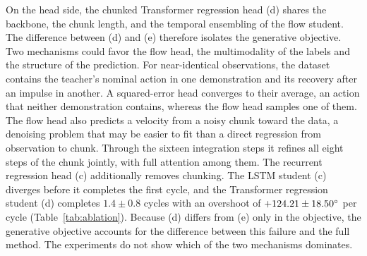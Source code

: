 On the head side, the chunked Transformer regression head (d) shares the backbone, the chunk length, and the temporal ensembling of the flow student. The difference between (d) and (e) therefore isolates the generative objective. Two mechanisms could favor the flow head, the multimodality of the labels and the structure of the prediction. For near-identical observations, the dataset contains the teacher's nominal action in one demonstration and its recovery after an impulse in another. A squared-error head converges to their average, an action that neither demonstration contains, whereas the flow head samples one of them. The flow head also predicts a velocity from a noisy chunk toward the data, a denoising problem that may be easier to fit than a direct regression from observation to chunk. Through the sixteen integration steps it refines all eight steps of the chunk jointly, with full attention among them. The recurrent regression head (c) additionally removes chunking. The \ac{LSTM} student (c) diverges before it completes the first cycle, and the Transformer regression student (d) completes $1.4\pm0.8$ cycles with an overshoot of $+124.21\pm18.50^\circ$ per cycle (Table~\ref{tab:ablation}). Because (d) differs from (e) only in the objective, the generative objective accounts for the difference between this failure and the full method. The experiments do not show which of the two mechanisms dominates.

